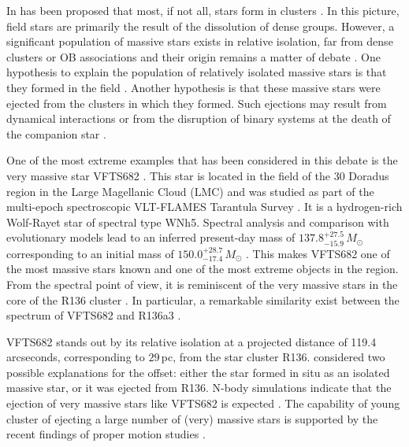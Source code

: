 \documentclass[a4paper,fleqn,usenatbib]{mnras}
\newcommand{\Msun}{{\,\mathrm{M}_\odot}}
\begin{document}
In has been proposed that most, if not all, stars form in clusters
\citep{lada:03}. In this picture, field stars are primarily the result
of the dissolution of dense groups.  However, a significant population
of massive stars exists in relative isolation, far from dense clusters
or OB associations and their origin remains a matter of debate
\citep{gvaramadze:12, lamb:16,ward:18}. One hypothesis to explain
the population of relatively isolated massive stars is that they
formed in the field \citep[e.g.,][]{parker:07}. Another
hypothesis is that these massive stars were ejected from the clusters
in which they formed. Such ejections may result from dynamical interactions \citep[e.g.,][]{poveda:67} or from the disruption of binary systems at the death of the companion  star \citep[e.g.,][]{blaauw:61, renzo:18}. 
 

One of the most extreme examples that has been considered in this debate is the very massive star VFTS682  \citep[][]{bestenlehner:11, bressert:12}. This star is located in the field of the 30 Doradus region in the Large Magellanic Cloud (LMC) and was studied as part of the multi-epoch spectroscopic VLT-FLAMES Tarantula Survey \citep[VFTS,][]{evans:11}. It is a hydrogen-rich Wolf-Rayet star of spectral type WNh5. Spectral analysis and comparison with evolutionary models lead to an inferred present-day mass of $137.8^{+27.5}_{-15.9}\,M_\odot$ corresponding to an initial mass of $150.0^{+28.7}_{-17.4}\,M_\odot$
\citep{schneider:18}. 
This makes VFTS682 one of the most massive stars known and one of the most extreme objects in the region.
From the spectral point of view, it is reminiscent of the very
massive stars in the core of the R136 cluster \citep{dekoter:97,crowther:10, crowther:16}. 
In particular, a remarkable similarity exist between the
spectrum of VFTS682 and R136a3 \citep{rubio-diez:17}.%

VFTS682 stands out by its relative isolation at a projected distance of 119.4 arcseconds, corresponding to 
$29$\,pc, from  the star cluster R136. \citet{bestenlehner:11}
considered two possible explanations for the offset: either
the star formed in situ as an isolated massive star, or it was ejected from  R136. N-body simulations 
indicate that the ejection of very massive stars like VFTS682 is
expected \citep[e.g.][]{fujii:11, banerjee:12}. The capability of
young cluster of ejecting a large number of (very) massive stars is supported by
the recent findings of proper motion studies \citep[e.g.,][]{lennon:18, drew:18}.
\end{document}
